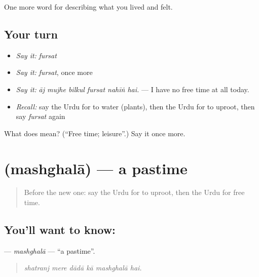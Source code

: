 \begin{grammarlens}[title={What you've built}]
One more word for describing what you lived and felt.
\end{grammarlens}

\subsection*{Your turn}
\begin{itemize}
\raggedright
  \item \emph{Say it:} \emph{fursat}
  \item \emph{Say it:} \emph{fursat}, once more
  \item \emph{Say it:} \emph{āj mujhe bilkul fursat nahīṅ hai.} — I have no free time at all today.
  \item \emph{Recall:} say the Urdu for to water (plants), then the Urdu for to uproot, then say \emph{fursat} again
\end{itemize}

\begin{tcolorbox}[breakable,colback=teal!4,colframe=teal!35!black,title={Before you move on}]
What does  mean? (\textquotedblleft{}Free time; leisure\textquotedblright{}.) Say it once more.
\end{tcolorbox}
\section[\texorpdfstring{\ur{مشغلہ} (mashghalā)}{مشغلہ (mashghalā)}]{ (mashghalā) — a pastime}

\label{lesson:UR-C513-mashghala}



\begin{quote}
Before the new one: say the Urdu for to uproot, then the Urdu for free time.
\end{quote}

\subsection*{You'll want to know: }
\textbf{} — \emph{mashghalā} — \textquotedblleft{}a pastime\textquotedblright{}.

\begin{quote}
     
\end{quote}

\begin{quote}
\emph{shatranj mere dādā kā mashghalā hai.}
\end{quote}

